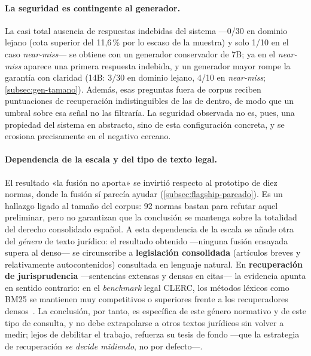 \paragraph{La seguridad es contingente al generador.} La casi total ausencia de respuestas indebidas del sistema —0/30 en dominio lejano (cota superior del 11,6\,\% por lo escaso de la muestra) y solo 1/10 en el caso \emph{near-miss}— se obtiene con un generador conservador de 7B; ya en el \emph{near-miss} aparece una primera respuesta indebida, y un generador mayor rompe la garantía con claridad (14B: 3/30 en dominio lejano, 4/10 en \emph{near-miss}; \ref{subsec:gen-tamano}). Además, esas preguntas fuera de corpus reciben puntuaciones de recuperación indistinguibles de las de dentro, de modo que un umbral sobre esa señal no las filtraría. La seguridad observada no es, pues, una propiedad del sistema en abstracto, sino de esta configuración concreta, y se erosiona precisamente en el negativo cercano.

\paragraph{Dependencia de la escala y del tipo de texto legal.} El resultado «la fusión no aporta» se invirtió respecto al prototipo de diez normas, donde la fusión sí parecía ayudar (\ref{subsec:flagship-pareado}). Es un hallazgo ligado al tamaño del corpus: 92 normas bastan para refutar aquel preliminar, pero no garantizan que la conclusión se mantenga sobre la totalidad del derecho consolidado español. A esta dependencia de la escala se añade otra del \emph{género} de texto jurídico: el resultado obtenido —ninguna fusión ensayada supera al denso— se circunscribe a \textbf{legislación consolidada} (artículos breves y relativamente autocontenidos) consultada en lenguaje natural. En \textbf{recuperación de jurisprudencia} —sentencias extensas y densas en citas— la evidencia apunta en sentido contrario: en el \emph{benchmark} legal CLERC, los métodos léxicos como BM25 se mantienen muy competitivos o superiores frente a los recuperadores densos~\cite{hou2024clerc}. La conclusión, por tanto, es específica de este género normativo y de este tipo de consulta, y no debe extrapolarse a otros textos jurídicos sin volver a medir; lejos de debilitar el trabajo, refuerza su tesis de fondo —que la estrategia de recuperación \emph{se decide midiendo}, no por defecto—.

